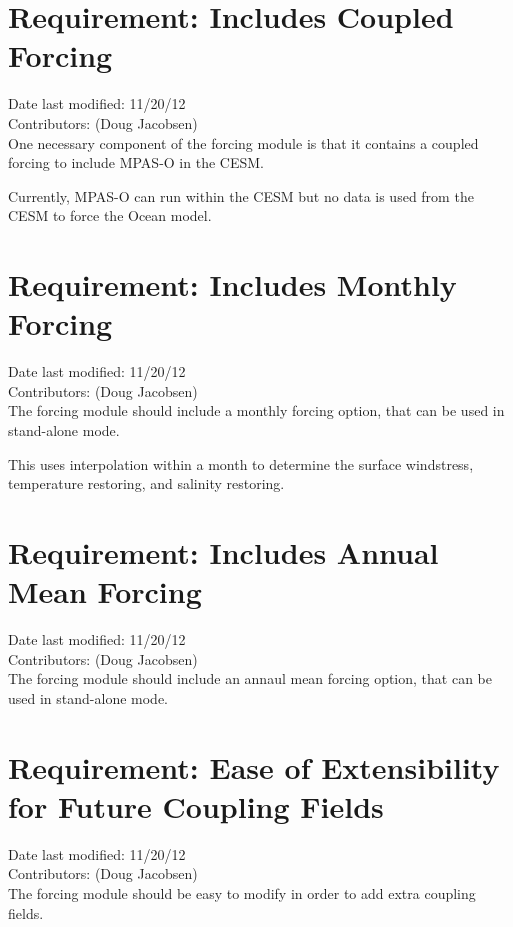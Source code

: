 \documentclass[11pt]{report}
\begin{document}
\section{Requirement: Includes Coupled Forcing}
Date last modified: 11/20/12 \\
Contributors: (Doug Jacobsen) \\

One necessary component of the forcing module is that it contains a coupled
forcing to include MPAS-O in the CESM.

Currently, MPAS-O can run within the CESM but no data is used from the CESM to
force the Ocean model.

\section{Requirement: Includes Monthly Forcing}
Date last modified: 11/20/12 \\
Contributors: (Doug Jacobsen) \\

The forcing module should include a monthly forcing option, that can be used in stand-alone mode.

This uses interpolation within a month to determine the surface windstress, temperature restoring, and salinity restoring.

\section{Requirement: Includes Annual Mean Forcing}
Date last modified: 11/20/12 \\
Contributors: (Doug Jacobsen) \\

The forcing module should include an annaul mean forcing option, that can be used in stand-alone mode.


\section{Requirement: Ease of Extensibility for Future Coupling Fields}
Date last modified: 11/20/12 \\
Contributors: (Doug Jacobsen) \\

The forcing module should be easy to modify in order to add extra coupling fields.

\end{document}

